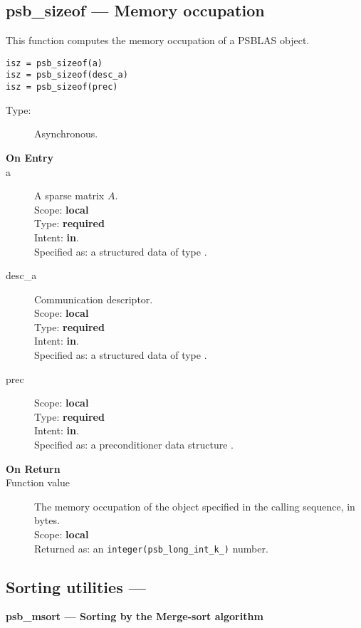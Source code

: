 \clearpage\subsection{psb\_sizeof --- Memory occupation}

This function computes the memory occupation of a PSBLAS object.


\begin{verbatim}
isz = psb_sizeof(a)
isz = psb_sizeof(desc_a)
isz = psb_sizeof(prec)
\end{verbatim}

\begin{description}
\item[Type:] Asynchronous.
\item[\bf On Entry]
\item[a] A sparse matrix
$A$. \\ 
Scope: {\bf local} \\
Type: {\bf required}\\
Intent: {\bf in}.\\
Specified as: a structured data of type \spdata.
\item[desc\_a] Communication descriptor.\\
Scope: {\bf local} \\
Type: {\bf required}\\
Intent: {\bf in}.\\
Specified as: a structured data of type \descdata.
\item[prec] 
Scope: {\bf local} \\
Type: {\bf required}\\
Intent: {\bf in}.\\
Specified as: a preconditioner data structure \precdata.
\item[\bf On Return] 
\item[Function value] The memory occupation of the object specified in
  the calling sequence, in bytes.\\
Scope: {\bf local} \\
Returned  as: an \verb|integer(psb_long_int_k_)| number.
\end{description}


\clearpage\subsection{Sorting utilities --- }

{\par\noindent\large\bfseries psb\_msort --- Sorting by the Merge-sort
  algorithm}

